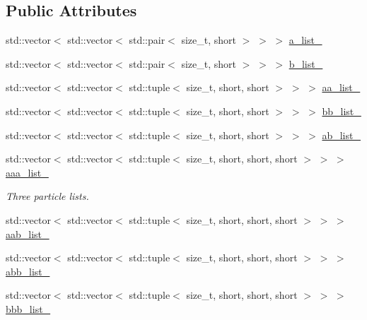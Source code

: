 \subsection*{Public Attributes}
\begin{DoxyCompactItemize}
\item 
std\+::vector$<$ std\+::vector$<$ std\+::pair$<$ size\+\_\+t, short $>$ $>$ $>$ \mbox{\hyperlink{classforte_1_1_determinant_substitution_lists_a5c532b82288f789be57dce094e465b3e}{a\+\_\+list\+\_\+}}
\item 
std\+::vector$<$ std\+::vector$<$ std\+::pair$<$ size\+\_\+t, short $>$ $>$ $>$ \mbox{\hyperlink{classforte_1_1_determinant_substitution_lists_ae1b8d28a3ab1de163ffbf0729c1ae5f9}{b\+\_\+list\+\_\+}}
\item 
std\+::vector$<$ std\+::vector$<$ std\+::tuple$<$ size\+\_\+t, short, short $>$ $>$ $>$ \mbox{\hyperlink{classforte_1_1_determinant_substitution_lists_ad2fcc8265c4039e46109946f77a7182b}{aa\+\_\+list\+\_\+}}
\item 
std\+::vector$<$ std\+::vector$<$ std\+::tuple$<$ size\+\_\+t, short, short $>$ $>$ $>$ \mbox{\hyperlink{classforte_1_1_determinant_substitution_lists_ad2f99a2ea3118e3fa5f84534fd6e271b}{bb\+\_\+list\+\_\+}}
\item 
std\+::vector$<$ std\+::vector$<$ std\+::tuple$<$ size\+\_\+t, short, short $>$ $>$ $>$ \mbox{\hyperlink{classforte_1_1_determinant_substitution_lists_ad2a5d042bcbe7a13223c5810d174a170}{ab\+\_\+list\+\_\+}}
\item 
std\+::vector$<$ std\+::vector$<$ std\+::tuple$<$ size\+\_\+t, short, short, short $>$ $>$ $>$ \mbox{\hyperlink{classforte_1_1_determinant_substitution_lists_ab4e96c9e2ccfee306a3bbb57f5441a35}{aaa\+\_\+list\+\_\+}}
\begin{DoxyCompactList}\small\item\em Three particle lists. \end{DoxyCompactList}\item 
std\+::vector$<$ std\+::vector$<$ std\+::tuple$<$ size\+\_\+t, short, short, short $>$ $>$ $>$ \mbox{\hyperlink{classforte_1_1_determinant_substitution_lists_a08c21d0c7c5594b4e245761fc99a929c}{aab\+\_\+list\+\_\+}}
\item 
std\+::vector$<$ std\+::vector$<$ std\+::tuple$<$ size\+\_\+t, short, short, short $>$ $>$ $>$ \mbox{\hyperlink{classforte_1_1_determinant_substitution_lists_a87d05dca8686a36a9d336c6df26a4655}{abb\+\_\+list\+\_\+}}
\item 
std\+::vector$<$ std\+::vector$<$ std\+::tuple$<$ size\+\_\+t, short, short, short $>$ $>$ $>$ \mbox{\hyperlink{classforte_1_1_determinant_substitution_lists_a857c7d93e3f03e996721b830ba376748}{bbb\+\_\+list\+\_\+}}
\end{DoxyCompactItemize}
